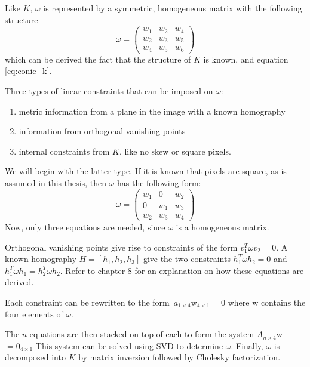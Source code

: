 Like $K$, $\omega$ is represented by a symmetric, homogeneous matrix with the following structure
$$
\omega = \begin{pmatrix}
	w_{1} & w_{2} & w_{4} \\
	w_{2} & w_{3} & w_{5} \\
	w_{4} & w_{5} & w_{6} 
\end{pmatrix}
$$
which can be derived the fact that the structure of $K$ is known, and equation \ref{eq:conic_k}.

Three types of linear constraints that can be imposed on $\omega$:
\begin{enumerate}
	\item metric information from a plane in the image with a known homography
	\item information from orthogonal vanishing points
	\item internal constraints from $K$, like no skew or square pixels.
\end{enumerate}

We will begin with the latter type.
If it is known that pixels are square, as is assumed in this thesis, then $\omega$ has the following form:
$$
\omega = \begin{pmatrix}
	w_{1} & 0 & w_{2} \\
	0 & w_{1} & w_{3} \\
	w_{2} & w_{3} & w_{4}
\end{pmatrix}
$$
Now, only three equations are needed, since $\omega$ is a homogeneous matrix.

Orthogonal vanishing points give rise to constraints of the form $v_{1}^T \omega v_{2} = 0$.
A known homography $H=[h_{1},h_{2},h_{3}]$ give the two constraints $h_{1}^T \omega h_{2} = 0$ and $h_{1}^T \omega h_{1} = h_{2}^T \omega h_{2}$. Refer to \cite{hartley-zisserman} chapter 8 for an explanation on how these equations are derived.

Each constraint can be rewritten to the form $a_{1 \times 4}$w$_{4 \times 1}=0$ where w contains the four elements of $\omega$.

The $n$ equations are then stacked on top of each to form the system $A_{n \times 4}$w$=0_{4 \times 1}$
This system can be solved using SVD to determine $\omega$.
Finally, $\omega$ is decomposed into $K$ by matrix inversion followed by Cholesky factorization. \cite[223-226]{hartley-zisserman}


